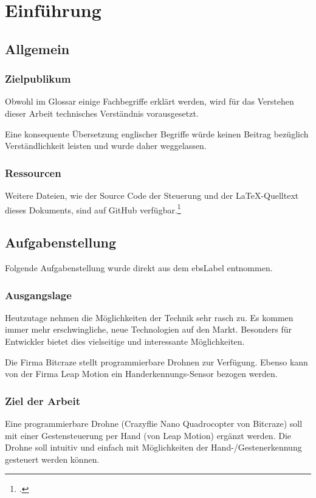 \chapter{Einführung}

\section{Allgemein}

\subsection{Zielpublikum}
Obwohl im Glossar einige Fachbegriffe erklärt werden, wird für das Verstehen dieser Arbeit technisches Verständnis vorausgesetzt.

Eine konsequente Übersetzung englischer Begriffe würde keinen Beitrag bezüglich Verständlichkeit leisten und wurde daher weggelassen.

\subsection{Ressourcen}
Weitere Dateien, wie der Source Code der Steuerung und der \LaTeX-Quelltext dieses Dokuments, sind auf GitHub verfügbar.\footcite{github_droneGestures_2015-05-01}


\section{Aufgabenstellung}
\label{sec:workdef}
Folgende Aufgabenstellung wurde direkt aus dem \gls{ebsLabel} entnommen.

\subsection{Ausgangslage}
Heutzutage nehmen die Möglichkeiten der Technik sehr rasch zu. Es kommen immer mehr erschwingliche, neue Technologien auf den Markt. Besonders für Entwickler bietet dies vielseitige und interessante Möglichkeiten.

Die Firma Bitcraze stellt programmierbare Drohnen zur Verfügung. Ebenso kann von der Firma Leap Motion ein Handerkennungs-Sensor bezogen werden.

\subsection{Ziel der Arbeit}
Eine programmierbare Drohne (Crazyflie Nano Quadrocopter von Bitcraze) soll mit einer Gestensteuerung per Hand (von Leap Motion) ergänzt werden.
Die Drohne soll intuitiv und einfach mit Möglichkeiten der Hand-/Gestenerkennung gesteuert werden können.

